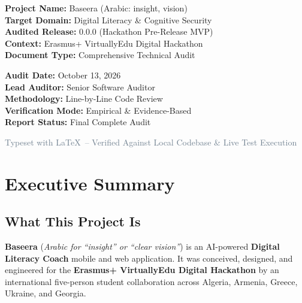 \documentclass[10pt,a4paper]{report}
\begin{document}
\begin{titlepage}
    \begin{minipage}{0.48\textwidth}
        \begin{flushleft} \small
            \textbf{Project Name:} Baseera (Arabic: insight, vision) \\
            \textbf{Target Domain:} Digital Literacy \& Cognitive Security \\
            \textbf{Audited Release:} 0.0.0 (Hackathon Pre-Release MVP) \\
            \textbf{Context:} Erasmus+ VirtuallyEdu Digital Hackathon \\
            \textbf{Document Type:} Comprehensive Technical Audit
        \end{flushleft}
    \end{minipage}
    \hfill
    \begin{minipage}{0.48\textwidth}
        \begin{flushright} \small
            \textbf{Audit Date:} October 13, 2026 \\
            \textbf{Lead Auditor:} Senior Software Auditor \\
            \textbf{Methodology:} Line-by-Line Code Review \\
            \textbf{Verification Mode:} Empirical \& Evidence-Based \\
            \textbf{Report Status:} Final Complete Audit
        \end{flushright}
    \end{minipage}
    
    \vfill
    {\footnotesize \textcolor{slateGray}{Typeset with \LaTeX\ -- Verified Against Local Codebase \& Live Test Execution}}
\end{titlepage}

\tableofcontents
\newpage

\chapter{Executive Summary}

\section{What This Project Is}
\textbf{Baseera} (\textit{Arabic for ``insight'' or ``clear vision''}) is an AI-powered \textbf{Digital Literacy Coach} mobile and web application. It was conceived, designed, and engineered for the \textbf{Erasmus+ VirtuallyEdu Digital Hackathon} by an international five-person student collaboration across Algeria, Armenia, Greece, Ukraine, and Georgia.
\end{document}
